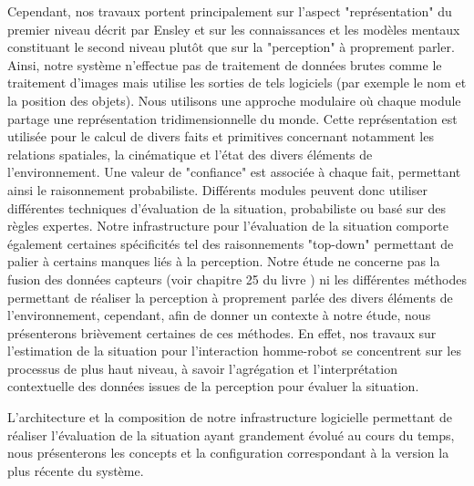 \documentclass[a4paper,11pt,twoside]{StyleThese}
\begin{document}
Cependant, nos travaux portent principalement sur l'aspect "représentation" du premier niveau décrit par Ensley et sur les connaissances et les modèles mentaux constituant le second niveau plutôt que sur la "perception" à proprement parler. Ainsi, notre système n'effectue pas de traitement de données brutes comme le traitement d'images mais utilise les sorties de tels logiciels (par exemple le nom et la position des objets).
Nous utilisons une approche modulaire où chaque module partage une représentation tridimensionnelle du monde. Cette représentation est utilisée pour le calcul de divers faits et primitives concernant notamment les relations spatiales, la cinématique et l'état des divers éléments de l'environnement.
Une valeur de "confiance" est associée à chaque fait, permettant ainsi le raisonnement probabiliste. Différents modules peuvent donc utiliser différentes techniques d'évaluation de la situation, probabiliste ou basé sur des règles expertes. Notre infrastructure pour l'évaluation de la situation comporte également certaines spécificités tel des raisonnements "top-down" permettant de palier à certains manques liés à la perception.
Notre étude ne concerne pas la fusion des données capteurs (voir chapitre 25 du livre \cite{siciliano2008springer}) ni les différentes méthodes permettant de réaliser la perception à proprement parlée des divers éléments de l'environnement, cependant, afin de donner un contexte à notre étude, nous présenterons brièvement certaines de ces méthodes. En effet, nos travaux sur l'estimation de la situation pour l'interaction homme-robot se concentrent sur les processus de plus haut niveau, à savoir l'agrégation et l'interprétation contextuelle des données issues de la perception pour évaluer la situation.

L'architecture et la composition de notre infrastructure logicielle permettant de réaliser l'évaluation de la situation ayant grandement évolué au cours du temps, nous présenterons les concepts et la configuration correspondant à la version la plus récente du système.

\end{document}
